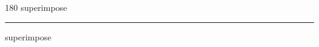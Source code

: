 
\begin{frame}
\begin{center}
\begin{turn}{180}
{\fontsize{2.5cm}{1em}\selectfont superimpose}
\end{turn}
\vspace{1em}\par  
\hrule
\vspace{1em}\par  
{\fontsize{2.5cm}{1em}\selectfont superimpose}
\end{center}
\end{frame}
